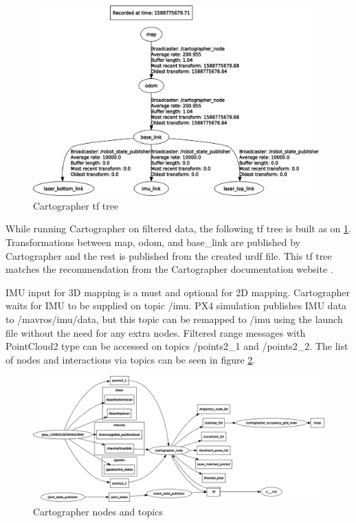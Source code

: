\begin{figure}[!ht]
    \centering
    \includegraphics[width=110mm, keepaspectratio]{figures/cartographer_tf_tree.png}
    \caption{Cartographer tf tree}
    \label{fig:cartographer_tf_tree}
\end{figure}


While running Cartographer on filtered data, the following tf tree is built as on \ref{fig:cartographer_tf_tree}.
Transformations between map, odom, and base\_link are published by Cartographer and the rest is published
from the created urdf file. This tf tree matches the recommendation from the Cartographer documentation
website \cite{CartographerDocumentation}.

IMU input for 3D mapping is a must and optional for 2D mapping. Cartographer waits for IMU to be supplied
on topic /imu. PX4 simulation publishes IMU data to /mavros/imu/data, but this topic can be remapped to /imu
using the launch file without the need for any extra nodes. Filtered range messages with PointCloud2 type
can be accessed on topics /points2\_1 and /points2\_2. The list of nodes and interactions via topics can be
seen in figure \ref{fig:cartographer_nodes}.

\begin{figure}[!ht]
    \centering
    \includegraphics[width=140mm, keepaspectratio]{figures/cartographer_nodes.png}
    \caption{Cartographer nodes and topics}
    \label{fig:cartographer_nodes}
\end{figure}

